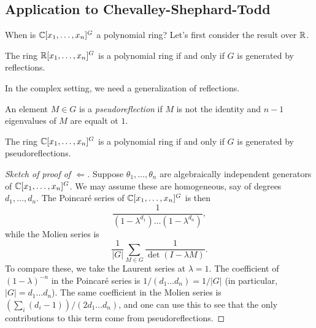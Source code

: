 \documentclass{amsart}
\begin{document}
\subsection{Application to Chevalley-Shephard-Todd}

When is $\mathbb{C}[x_1, \dots, x_n]^G$ a polynomial ring?
Let's first consider the result over $\mathbb{R}$.

\begin{thm}
	The ring $\mathbb{R}[x_1, \dots, x_n]^G$ is a polynomial ring if and only if $G$ is generated by reflections.
\end{thm}

In the complex setting, we need a generalization of reflections.

\begin{dfn}
	An element $M \in G$ is a \emph{pseudoreflection} if $M$ is not the identity and $n - 1$ eigenvalues of $M$ are equalt ot $1$.
\end{dfn}

\begin{thm}
	The ring $\mathbb{C}[x_1, \dots, x_n]^G$ is a polynomial ring if and only if $G$ is generated by pseudoreflections.
\end{thm}

\begin{proof}[Sketch of proof of $\Leftarrow$]
	Suppose $\theta_1, \dots, \theta_n$ are algebraically independent generators of $\mathbb{C}[x_1, \dots, x_n]^G$.
	We may assume these are homogeneous, say of degrees $d_1, \dots, d_n$.
	The Poincar\'e series of $\mathbb{C}[x_1, \dots, x_n]^G$ is then
	\[
		\frac{1}{(1 - \lambda^{d_1}) \dots (1 - \lambda^{d_n})},
	\]
	while the Molien series is
	\[
		\frac{1}{|G|} \sum_{M \in G} \frac{1}{\det(I - \lambda M)}.
	\]
	To compare these, we take the Laurent series at $\lambda = 1$.
	The coefficient of $(1 - \lambda)^{-n}$ in the Poincar\'e series is $1 / (d_1 \dots d_n) = 1 / |G|$ (in particular, $|G| = d_1 \dots d_n$).
	The same coefficient in the Molien series is $(\sum_i (d_i - 1)) / (2 d_1 \dots d_n)$, and one can use this to see that the only contributions to this term come from pseudoreflections.
\end{proof}
\end{document}
